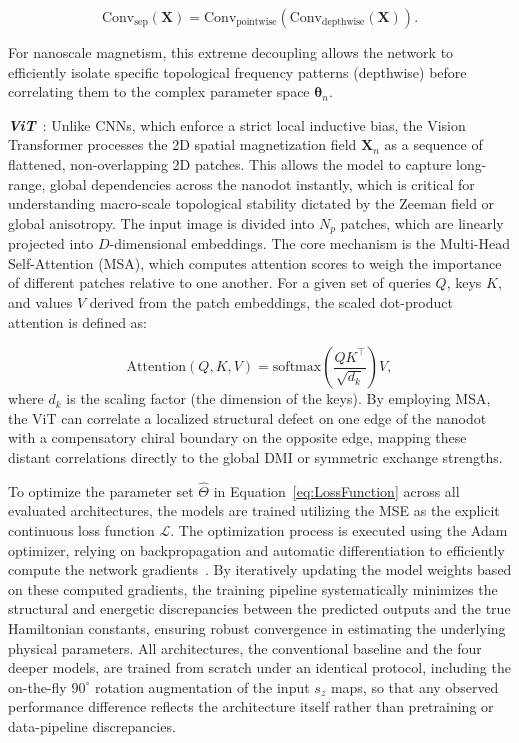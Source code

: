 \documentclass[final,5p,times,twocolumn]{elsarticle}
\begin{document}
\begin{equation}\label{eq:Xception}
\text{Conv}_{\text{sep}}(\mathbf{X}) = \text{Conv}_{\text{pointwise}}(\text{Conv}_{\text{depthwise}}(\mathbf{X})).
\end{equation}

For nanoscale magnetism, this extreme decoupling allows the network to efficiently isolate specific topological frequency patterns (depthwise) before correlating them to the complex parameter space $\boldsymbol{\theta}_n$.



\emph{\textbf{ViT}}~\cite{dosovitskiy2020image}: Unlike CNNs, which enforce a strict local inductive bias, the Vision Transformer processes the 2D spatial magnetization field $\mathbf{X}_n$ as a sequence of flattened, non-overlapping 2D patches. This allows the model to capture long-range, global dependencies across the nanodot instantly, which is critical for understanding macro-scale topological stability dictated by the Zeeman field or global anisotropy. The input image is divided into $N_p$ patches, which are linearly projected into $D$-dimensional embeddings. The core mechanism is the Multi-Head Self-Attention (MSA), which computes attention scores to weigh the importance of different patches relative to one another. For a given set of queries $Q$, keys $K$, and values $V$ derived from the patch embeddings, the scaled dot-product attention is defined as:

\begin{equation}\label{eq:ViT}
\text{Attention}(Q, K, V) = \text{softmax}\left(\frac{QK^\top}{\sqrt{d_k}}\right)V,
\end{equation}
where $d_k$ is the scaling factor (the dimension of the keys). By employing MSA, the ViT can correlate a localized structural defect on one edge of the nanodot with a compensatory chiral boundary on the opposite edge, mapping these distant correlations directly to the global DMI or symmetric exchange strengths.



To optimize the parameter set $\hat{\Theta}$ in Equation~\ref{eq:LossFunction} across all evaluated architectures, the models are trained utilizing the MSE as the explicit continuous loss function $\mathcal{L}$. The optimization process is executed using the Adam optimizer, relying on backpropagation and automatic differentiation to efficiently compute the network gradients~\cite{murakami2022inverse}. By iteratively updating the model weights based on these computed gradients, the training pipeline systematically minimizes the structural and energetic discrepancies between the predicted outputs and the true Hamiltonian constants, ensuring robust convergence in estimating the underlying physical parameters. All architectures, the conventional baseline and the four deeper models, are trained from scratch under an identical protocol, including the on-the-fly $90^\circ$ rotation augmentation of the input $s_z$ maps, so that any observed performance difference reflects the architecture itself rather than pretraining or data-pipeline discrepancies.
\end{document}

